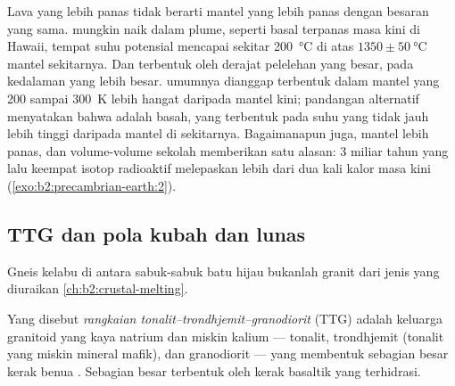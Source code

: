 Lava yang lebih panas tidak berarti mantel yang lebih panas dengan besaran yang sama.  mungkin naik dalam
plume, seperti basal terpanas masa kini di Hawaii, tempat suhu potensial mencapai
sekitar \qty{200}{\celsius} di atas $1350 \pm \qty{50}{\celsius}$ mantel sekitarnya. Dan
 terbentuk oleh derajat pelelehan yang besar, pada kedalaman yang lebih besar.  umumnya dianggap
terbentuk dalam mantel yang 200 sampai \qty{300}{K} lebih hangat daripada mantel kini; pandangan alternatif menyatakan bahwa
 adalah  basah, yang terbentuk pada suhu yang tidak jauh lebih tinggi daripada mantel
di sekitarnya. Bagaimanapun juga, mantel  lebih panas, dan volume-volume
sekolah memberikan satu alasan: 3 miliar tahun yang lalu keempat isotop radioaktif melepaskan lebih dari
dua kali kalor masa kini (\cref{exo:b2:precambrian-earth:2}).

\subsection*{TTG dan pola kubah dan lunas}

Gneis kelabu di antara sabuk-sabuk batu hijau bukanlah granit dari jenis yang
diuraikan \cref{ch:b2:crustal-melting}.

\begin{definition}\label{def:b2:precambrian-earth:ttg}
Yang disebut \emph{rangkaian tonalit--trondhjemit--granodiorit}
(TTG) adalah keluarga granitoid yang kaya natrium dan miskin kalium --- tonalit,
trondhjemit (tonalit yang miskin mineral mafik), dan granodiorit --- yang membentuk sebagian besar
kerak benua . Sebagian besar terbentuk oleh  kerak basaltik
yang terhidrasi.
\end{definition}

